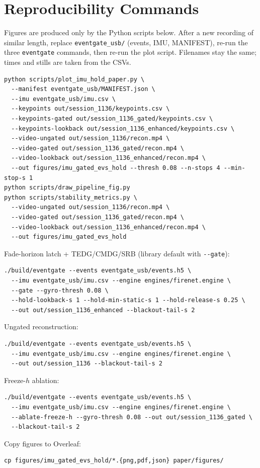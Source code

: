 \documentclass[journal]{IEEEtran}
\begin{document}
\section{Reproducibility Commands}
Figures are produced only by the Python scripts below. After a new recording of
similar length, replace \texttt{eventgate\_usb/} (events, IMU, MANIFEST), re-run
the three \texttt{eventgate} commands, then re-run the plot script. Filenames
stay the same; times and stills are taken from the CSVs.

\begin{verbatim}
python scripts/plot_imu_hold_paper.py \
  --manifest eventgate_usb/MANIFEST.json \
  --imu eventgate_usb/imu.csv \
  --keypoints out/session_1136/keypoints.csv \
  --keypoints-gated out/session_1136_gated/keypoints.csv \
  --keypoints-lookback out/session_1136_enhanced/keypoints.csv \
  --video-ungated out/session_1136/recon.mp4 \
  --video-gated out/session_1136_gated/recon.mp4 \
  --video-lookback out/session_1136_enhanced/recon.mp4 \
  --out figures/imu_gated_evs_hold --thresh 0.08 --n-stops 4 --min-stop-s 1
python scripts/draw_pipeline_fig.py
python scripts/stability_metrics.py \
  --video-ungated out/session_1136/recon.mp4 \
  --video-gated out/session_1136_gated/recon.mp4 \
  --video-lookback out/session_1136_enhanced/recon.mp4 \
  --out figures/imu_gated_evs_hold
\end{verbatim}

Fade-horizon latch + TEDG/CMDG/SRB (library default with \texttt{-{}-gate}):
\begin{verbatim}
./build/eventgate --events eventgate_usb/events.h5 \
  --imu eventgate_usb/imu.csv --engine engines/firenet.engine \
  --gate --gyro-thresh 0.08 \
  --hold-lookback-s 1 --hold-min-static-s 1 --hold-release-s 0.25 \
  --out out/session_1136_enhanced --blackout-tail-s 2
\end{verbatim}

Ungated reconstruction:
\begin{verbatim}
./build/eventgate --events eventgate_usb/events.h5 \
  --imu eventgate_usb/imu.csv --engine engines/firenet.engine \
  --out out/session_1136 --blackout-tail-s 2
\end{verbatim}

Freeze-\(h\) ablation:
\begin{verbatim}
./build/eventgate --events eventgate_usb/events.h5 \
  --imu eventgate_usb/imu.csv --engine engines/firenet.engine \
  --ablate-freeze-h --gyro-thresh 0.08 --out out/session_1136_gated \
  --blackout-tail-s 2
\end{verbatim}

Copy figures to Overleaf:
\begin{verbatim}
cp figures/imu_gated_evs_hold/*.{png,pdf,json} paper/figures/
\end{verbatim}



\end{document}
